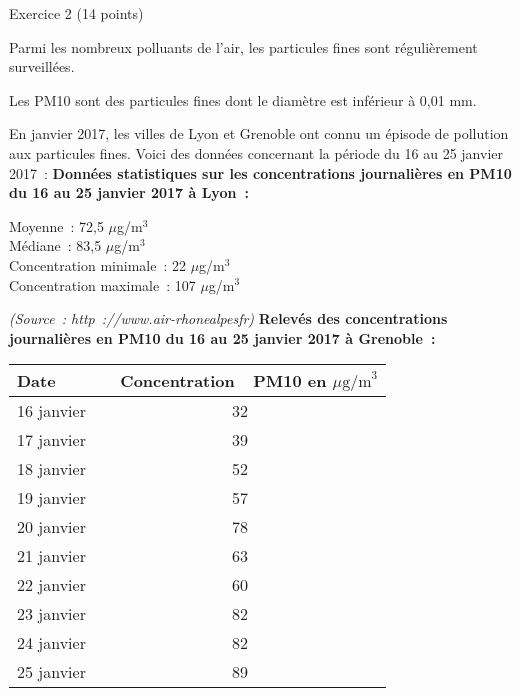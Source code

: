 
%
\begin{h2}Exercice 2 (14 points)\end{h2}
\medbreak
Parmi les nombreux polluants de l'air, les particules fines sont régulièrement surveillées.
\par
Les PM10 sont des particules fines dont le diamètre est inférieur à 0,01 mm.
\par
En janvier 2017, les villes de Lyon et Grenoble ont connu un épisode de pollution aux particules fines. Voici des données concernant la période du 16 au 25 janvier 2017~:
\medbreak
\textbf{Données statistiques sur les concentrations journalières en PM10 du
16 au 25 janvier 2017 à Lyon~:}
\par
\begin{indent}
     Moyenne~: 72,5 $\mu$g/m$^3$\\
     Médiane~: 83,5 $\mu$g/m$^3$\\
     Concentration minimale~: 22 $\mu$g/m$^3$\\
     Concentration maximale~: 107 $\mu$g/m$^3$\\
\end{indent}
\emph{(Source~: http~://www.air-rhonealpesfr)}
\bigbreak
\textbf{Relevés des concentrations journalières en PM10 du 16 au 25 janvier 2017 à
Grenoble~:}\\
\begin{center}
     \begin{tabular}{|l|c|}\hline%
          Date 		&~~Concentration~~PM10  en $\mu\text{g/m}^3$\\ \hline
          16 janvier 	&32\\ \hline
          17 janvier 	&39\\ \hline
          18 janvier 	&52\\ \hline
          19 janvier 	&57\\ \hline
          20 janvier 	&78\\ \hline
          21 janvier 	&63\\ \hline
          22 janvier 	&60\\ \hline
          23 janvier 	&82\\ \hline
          24 janvier 	&82\\ \hline
          25 janvier 	&89\\ \hline
     \end{tabular}
\end{center}
